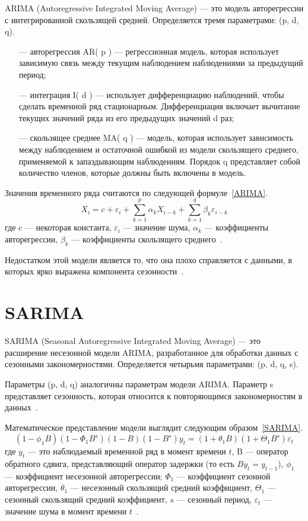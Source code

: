 \documentclass[a4paper, 14pt]{extreport}
\begin{document}
ARIMA (Autoregressive Integrated Moving Average) --- это модель авторегрессии с интегрированной скользящей средней. 
Определяется тремя параметрами: (p, d, q).
\begin{itemize}
	\item[---] авторегрессия AR( p ) --- регрессионная модель, которая использует зависимую связь между текущим 
	наблюдением наблюдениями за предыдущий период;
	\item[---] интеграция I( d )  --- использует дифференциацию наблюдений, чтобы сделать временной ряд стационарным. 
	Дифференциация включает вычитание текущих значений ряда из его предыдущих значений d раз;
	\item[---] скользящее среднее MA( q ) --- модель, которая использует зависимость между наблюдением и остаточной 
	ошибкой из модели скользящего среднего, применяемой к запаздывающим наблюдениям. Порядок q представляет собой 
	количество членов, которые должны быть включены в модель.
\end{itemize}

Значения временного ряда считаются по следующей формуле~\ref{ARIMA}.
\begin{equation}
	\label{ARIMA}
	 X_i = c + \varepsilon_i +\sum \limits _{k=1}^{p} \alpha_kX_{i-k} +\sum \limits _{k=1}^{q} \beta_k\varepsilon_{i-k}
\end{equation}
где $c$ --- некоторая константа, $\varepsilon_{i}$ --- значение шума, $\alpha_{k}$ --- коэффициенты авторегрессии, $\beta_{k}$ ---
коэффициенты скользящего среднего~\cite{kizbek}.

Недостатком этой модели является то, что она плохо справляется с данными, в которых ярко выражена компонента 
сезонности~\cite{kizbek}.

\section{SARIMA}

SARIMA (Seasonal Autoregressive Integrated Moving Average) --- это расширение несезонной модели ARIMA, разработанное для 
обработки данных с сезонными закономерностями. Определяется четырьмя параметрами: (p, d, q, s).

Параметры (p, d, q) аналогичны параметрам модели ARIMA. Параметр s представляет сезонность, которая относится к 
повторяющимся закономерностям в данных~\cite{kizbek}.

Математическое представление модели выглядит следующим образом~\ref{SARIMA}.
\begin{equation}
	\label{SARIMA}
	(1 - \phi_1B )(1 - \Phi_1B^{s})(1 - B)(1 - B^s)y_t = (1 + \theta_1B )(1 + \Theta_1B^s)\varepsilon_t
\end{equation}
где $y_t$ --- это наблюдаемый временной ряд в момент времени $t$, B --- оператор обратного сдвига, представляющий 
оператор задержки (то есть $By_t = y_{t-1}$), $\phi_1$ --- коэффициент несезонной авторегрессии; $\Phi_1$ --- коэффициент 
сезонной авторегрессии, $\theta_1$ --- несезонный скользящий средний коэффициент, $ \Theta_1$ --- сезонный скользящий 
средний коэффициент, $s$ --- сезонный период, $\varepsilon_t$ --- значение шума в момент времени $t$~\cite{kizbek}.
\end{document}
